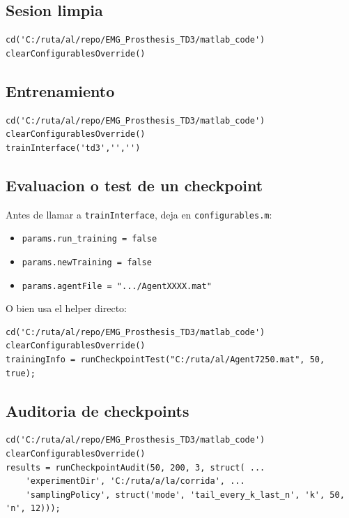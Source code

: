 \documentclass[11pt,a4paper]{article}
\begin{document}
\subsection{Sesion limpia}

\begin{lstlisting}
cd('C:/ruta/al/repo/EMG_Prosthesis_TD3/matlab_code')
clearConfigurablesOverride()
\end{lstlisting}

\subsection{Entrenamiento}

\begin{lstlisting}
cd('C:/ruta/al/repo/EMG_Prosthesis_TD3/matlab_code')
clearConfigurablesOverride()
trainInterface('td3','','')
\end{lstlisting}

\subsection{Evaluacion o test de un checkpoint}

Antes de llamar a \texttt{trainInterface}, deja en \texttt{configurables.m}:

\begin{itemize}
\item \texttt{params.run\_training = false}
\item \texttt{params.newTraining = false}
\item \texttt{params.agentFile = ".../AgentXXXX.mat"}
\end{itemize}

O bien usa el helper directo:

\begin{lstlisting}
cd('C:/ruta/al/repo/EMG_Prosthesis_TD3/matlab_code')
clearConfigurablesOverride()
trainingInfo = runCheckpointTest("C:/ruta/al/Agent7250.mat", 50, true);
\end{lstlisting}

\subsection{Auditoria de checkpoints}

\begin{lstlisting}
cd('C:/ruta/al/repo/EMG_Prosthesis_TD3/matlab_code')
clearConfigurablesOverride()
results = runCheckpointAudit(50, 200, 3, struct( ...
    'experimentDir', 'C:/ruta/a/la/corrida', ...
    'samplingPolicy', struct('mode', 'tail_every_k_last_n', 'k', 50, 'n', 12)));
\end{lstlisting}
\end{document}
